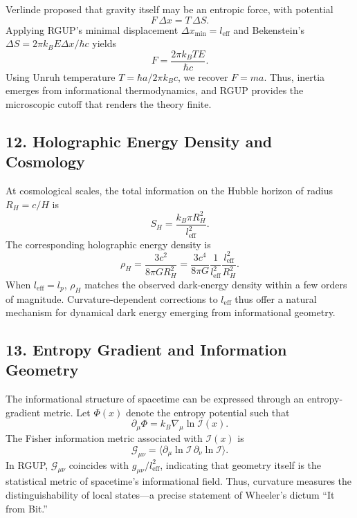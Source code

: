 \documentclass[11pt,oneside]{book}
\numberwithin{equation}{chapter}
\begin{document}
Verlinde proposed that gravity itself may be an entropic force, with potential
\begin{equation}
F\,\Delta x = T\,\Delta S.
\end{equation}
Applying RGUP’s minimal displacement $\Delta x_{\min} = l_{\text{eff}}$ and Bekenstein’s $\Delta S = 2\pi k_B E \Delta x / \hbar c$ yields
\begin{equation}
F = \frac{2\pi k_B T E}{\hbar c}.
\end{equation}
Using Unruh temperature $T = \hbar a / 2\pi k_B c$, we recover $F = m a$.  
Thus, inertia emerges from informational thermodynamics, and RGUP provides the microscopic cutoff that renders the theory finite.

\subsection*{12. Holographic Energy Density and Cosmology}

At cosmological scales, the total information on the Hubble horizon of radius $R_H = c/H$ is
\begin{equation}
S_H = \frac{k_B \pi R_H^2}{l_{\text{eff}}^2}.
\end{equation}
The corresponding holographic energy density is
\begin{equation}
\rho_H = \frac{3 c^2}{8\pi G R_H^2}
= \frac{3 c^4}{8\pi G} \frac{1}{l_{\text{eff}}^2} \frac{l_{\text{eff}}^2}{R_H^2}.
\end{equation}
When $l_{\text{eff}} = l_p$, $\rho_H$ matches the observed dark-energy density within a few orders of magnitude.  
Curvature-dependent corrections to $l_{\text{eff}}$ thus offer a natural mechanism for dynamical dark energy emerging from informational geometry.

\subsection*{13. Entropy Gradient and Information Geometry}

The informational structure of spacetime can be expressed through an entropy-gradient metric.  
Let $\Phi(x)$ denote the entropy potential such that
\begin{equation}
\partial_\mu \Phi = k_B \nabla_\mu \ln \mathcal{I}(x).
\end{equation}
The Fisher information metric associated with $\mathcal{I}(x)$ is
\begin{equation}
\mathcal{G}_{\mu\nu} = 
\langle \partial_\mu \ln \mathcal{I}\,
\partial_\nu \ln \mathcal{I}\rangle.
\end{equation}
In RGUP, $\mathcal{G}_{\mu\nu}$ coincides with $g_{\mu\nu}/l_{\text{eff}}^2$, indicating that geometry itself is the statistical metric of spacetime’s informational field.  
Thus, curvature measures the distinguishability of local states—a precise statement of Wheeler’s dictum “It from Bit.”
\end{document}
